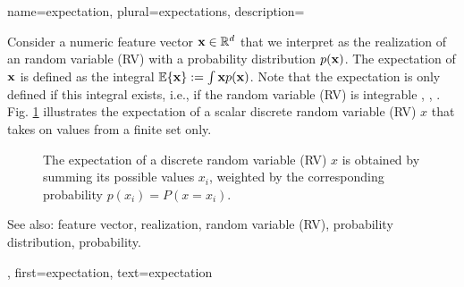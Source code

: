 {
{name={expectation}, plural={expectations},
  description={Consider a numeric feature vector ${\bf x} \in \mathbb{R}^{d}$ 
	that we interpret as the realization of an random variable (RV) with a probability distribution $p({\bf x})$. 
	The expectation of ${\bf x}$ is defined as the integral $\mathbb{E}  \{ {\bf x} \} := \int {\bf x} p({\bf x})$. 
	Note that the expectation is only defined if this integral exists, i.e., if the random variable (RV) is integrable 
	\cite{RudinBookPrinciplesMatheAnalysis}, \cite{BillingsleyProbMeasure}, \cite{HalmosMeasure}. 
	Fig. \ref{fig_expect_discrete_dict} illustrates the expectation of a scalar discrete random variable (RV) $x$ that takes on values 
	from a finite set only. 
   \begin{figure}[H]
   	\begin{center}
\end{center}
\vspace*{-5mm}
\caption{The expectation of a discrete random variable (RV) $x$ is obtained by summing its possible values $x_{i}$, weighted 
	by the corresponding probability $p(x_i) = P\left(x= x_i\right)$. \label{fig_expect_discrete_dict}}
 \end{figure}
		See also: feature vector, realization, random variable (RV), probability distribution, probability.},
first={expectation},
text={expectation}
}

}
